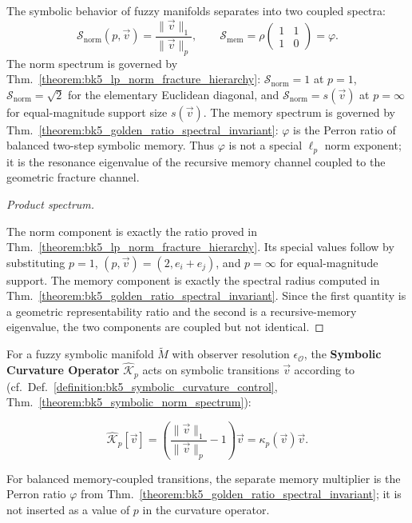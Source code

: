 \begin{theorem}
\label{theorem:bk5_symbolic_norm_spectrum}
The symbolic behavior of fuzzy manifolds separates into two coupled spectra:
\[
\mathcal{S}_{\mathrm{norm}}(p,\vec{v})
=\frac{\|\vec{v}\|_1}{\|\vec{v}\|_p},
\qquad
\mathcal{S}_{\mathrm{mem}}
=\rho\begin{pmatrix}1&1\\1&0\end{pmatrix}=\varphi.
\]
The norm spectrum is governed by Thm.~\ref{theorem:bk5_lp_norm_fracture_hierarchy}:
$\mathcal{S}_{\mathrm{norm}}=1$ at $p=1$,
$\mathcal{S}_{\mathrm{norm}}=\sqrt{2}$ for the elementary Euclidean diagonal,
and $\mathcal{S}_{\mathrm{norm}}=s(\vec{v})$ at $p=\infty$ for equal-magnitude
support size $s(\vec{v})$.  The memory spectrum is governed by
Thm.~\ref{theorem:bk5_golden_ratio_spectral_invariant}: $\varphi$ is the Perron
ratio of balanced two-step symbolic memory.  Thus $\varphi$ is not a special
$\ell_p$ norm exponent; it is the resonance eigenvalue of the recursive memory
channel coupled to the geometric fracture channel.
\end{theorem}

\begin{proof}[Product spectrum]
\label{proof:bk5_symbolic_norm_spectrum}
\leavevmode

The norm component is exactly the ratio proved in
Thm.~\ref{theorem:bk5_lp_norm_fracture_hierarchy}.  Its special values follow
by substituting $p=1$, $(p,\vec{v})=(2,e_i+e_j)$, and $p=\infty$ for
equal-magnitude support.  The memory component is exactly the spectral radius
computed in Thm.~\ref{theorem:bk5_golden_ratio_spectral_invariant}.  Since the
first quantity is a geometric representability ratio and the second is a
recursive-memory eigenvalue, the two components are coupled but not identical.
\end{proof}

\begin{definition}
\label{definition:bk5_symbolic_curvature_operator_spectrum}
For a fuzzy symbolic manifold $\tilde{M}$ with observer resolution
$\epsilon_\mathcal{O}$, the \textbf{Symbolic Curvature Operator}
$\hat{\mathcal{K}}_p$ acts on symbolic transitions $\vec{v}$ according to
(cf.~Def.~\ref{definition:bk5_symbolic_curvature_control},
Thm.~\ref{theorem:bk5_symbolic_norm_spectrum}):

\[
\hat{\mathcal{K}}_p[\vec{v}]
=\left(\frac{\|\vec{v}\|_1}{\|\vec{v}\|_p}-1\right)\vec{v}
=\kappa_p(\vec{v})\vec{v}.
\]

For balanced memory-coupled transitions, the separate memory multiplier is the
Perron ratio $\varphi$ from
Thm.~\ref{theorem:bk5_golden_ratio_spectral_invariant}; it is not inserted as
a value of $p$ in the curvature operator.
\end{definition}

